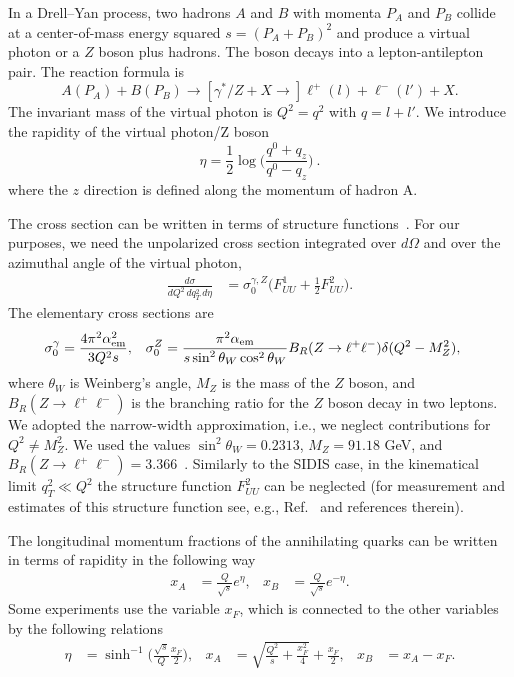 \documentclass[aps,preprintnumbers,showpacs,nofootinbib,superscriptaddress,floatfix]{revtex4}
\begin{document}
In a Drell--Yan process, two hadrons $A$ and $B$ with momenta $P_A$ and $P_B$
collide at a center-of-mass energy squared $s = (P_A + P_B)^2$ 
and produce a virtual photon or a $Z$ boson plus hadrons. 
The boson decays into a
lepton-antilepton pair. The reaction formula is
\begin{equation}
A(P_A)+B(P_B)\to [\gamma^*/Z + X \to] \ell^+(l) + \ell^-(l') + X.
\end{equation} 
The invariant mass of the virtual photon is $Q^2=q^2$ with $q = l + l'$. 
We introduce the rapidity of the virtual photon/Z boson
\begin{equation}
\eta=\frac{1}{2}\log\bigg(\frac{q^0+q_z}{q^0-q_z}\bigg)\  .
\end{equation} 
where the $z$ direction is defined along the momentum of hadron A.

The cross section can be written in terms of structure
functions~\cite{Boer:2006eq,Arnold:2008kf}. For our purposes, we need the unpolarized 
cross section
integrated over $d\Omega$ and over the azimuthal angle of the virtual photon, 
\begin{align}
\label{e:dsigma_gZ}
\frac{d\sigma}{dQ^2\, dq_T^2\,d\eta} &= \sigma_0^{\gamma,Z}
\bigg(F_{UU}^1 + \frac{1}{2} F_{UU}^2\bigg). 
\end{align} 
The elementary cross sections are
\begin{align}
\sigma_0^{\gamma} &= \frac{4\pi^2 \alpha^2_{\rm em}}{3 Q^2 s},
&
\sigma_0^Z &= 
\frac{\pi^2 \alpha_{\rm em}}{s \sin^2{\theta_W} \cos^2{\theta_W}}
B_R(Z\rightarrow \ell^+\ell^-)
\delta(Q^2 - M_Z^2), 
\label{e:elem_cs_sig0}
\end{align} 
where $\theta_W$ is Weinberg's angle, $M_Z$ is the mass of the $Z$ boson, and
$B_R(Z\rightarrow \ell^+\ell^-)$ 
is the branching ratio for the $Z$ boson decay in two leptons.
We adopted the narrow-width approximation, i.e., we neglect contributions for 
$Q^2 \neq M_Z^2$. 
We used the values 
$\sin^2 \theta_W= 0.2313$, $M_Z = 91.18$ GeV, and 
$B_R(Z\rightarrow \ell^+\ell^-)=3.366$~\cite{Olive:2016xmw}.  
Similarly to the SIDIS case, in the kinematical limit $q_T^2 \ll Q^2$ 
the structure function $F_{UU}^2$ can be neglected 
(for measurement and estimates of this
structure function see, e.g.,
Ref.~\cite{Lambertsen:2016wgj} and references therein). 

The longitudinal momentum fractions of the annihilating quarks
can be written in terms of
rapidity in the following way 
\begin{align}
x_A &= \frac{Q}{\sqrt{s}} e^{\eta},
&
x_B &= \frac{Q}{\sqrt{s}} e^{-\eta}.
\label{xab}
\end{align} 
Some experiments use the variable $x_F$, which is connected to the other
variables  by the following relations
\begin{align}
\label{e:eta_xf}
\eta &= \sinh^{-1}\bigg(\frac{\sqrt{s}}{Q}\frac{x_F}{2}\bigg),
& 
x_{A} &= \sqrt{\frac{Q^2}{s} + \frac{x_F^2}{4}} + \frac{x_F}{2},
&
x_B &= x_A - x_F.  
\end{align} 
\end{document}
